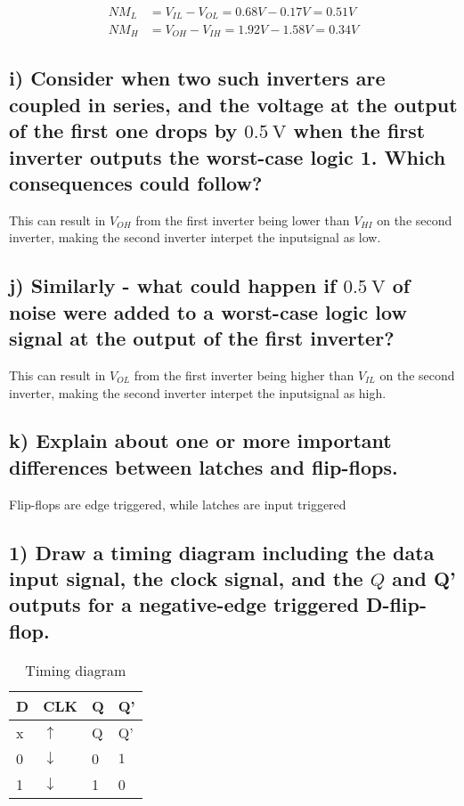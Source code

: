 $$\begin{aligned}
    NM_L&=V_{IL}-V_{OL}=0.68V-0.17V=0.51V\\
    NM_H&=V_{OH}-V_{IH}=1.92V-1.58V=0.34V
\end{aligned}$$

\subsection*{i) Consider when two such inverters are coupled in series, and the voltage at the output of the first one drops by $0.5 \mathrm{~V}$ when the first inverter outputs the worst-case logic 1. Which consequences could follow?}

This can result in $V_{OH}$ from the first inverter being lower than $V_{HI}$ on the second inverter, making the second inverter interpet the inputsignal as low.

\subsection*{j) Similarly - what could happen if $0.5 \mathrm{~V}$ of noise were added to a worst-case logic low signal at the output of the first inverter?}

This can result in $V_{OL}$ from the first inverter being higher than $V_{IL}$ on the second inverter, making the second inverter interpet the inputsignal as high.

\subsection*{k) Explain about one or more important differences between latches and flip-flops.}

Flip-flops are edge triggered, while latches are input triggered

\subsection*{1) Draw a timing diagram including the data input signal, the clock signal, and the $Q$ and Q' outputs for a negative-edge triggered D-flip-flop.}

\begin{table}[H]
    \centering
    \caption{Timing diagram}
    \begin{tabular}{llll}
\hline
D& CLK & Q & Q'\\
\hline
x&$\uparrow$ &Q& Q' \\
0&$\downarrow$ &0&$1$ \\
1&$\downarrow$&1&0\\
\hline
    \end{tabular}
    \end{table}